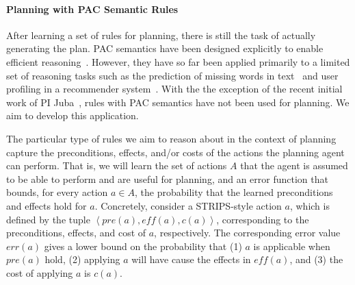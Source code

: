 \documentclass[12pt]{article}
\newcommand{\note}[1]{\textbf{\textit{#1}}}
\newcommand{\tuple}[1]{\ensuremath{\left \langle #1 \right \rangle }}
\newcommand{\eff}{\textit{eff}}
\newcommand{\pre}{\textit{pre}}
\begin{document}


\paragraph{Planning with PAC Semantic Rules}


After learning a set of rules for planning, there is still the task of actually generating the plan. PAC semantics have been designed explicitly to enable efficient reasoning~\cite{valiant2000robustLogics}. However, they have so far been applied primarily to a limited set of reasoning tasks such as the prediction of missing words in text~\cite{michael2008first} and user profiling in a recommender system~\cite{semeraro2009knowledge}. With the the exception of the recent initial work of PI Juba~\cite{juba2016jmlr}, rules with PAC semantics have not been used for planning. We aim to develop this application. 



The particular type of rules we aim to reason about in the context of planning capture the preconditions, effects, and/or costs of the actions the planning agent can perform. 
That is, we will learn the set of actions $A$ that the agent is assumed to be able to perform and are useful for planning, 
and an error function that bounds, for every action $a\in A$, 
the probability that the learned preconditions and effects hold for $a$.
Concretely, consider a STRIPS-style action $a$, which is defined by the tuple $\tuple{\pre(a), \eff(a), c(a)}$, corresponding to the preconditions, effects, and cost of $a$, respectively. The corresponding error value $err(a)$ gives a lower bound on the probability that (1) $a$ is applicable when $\pre(a)$ hold, (2) applying $a$ will have cause the effects in $\eff(a)$, and (3) the cost of applying $a$ is $c(a)$. 
\end{document}
